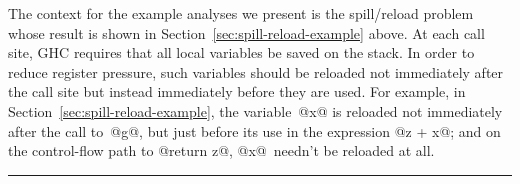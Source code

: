 \documentclass[blockstyle,preprint,nocopyrightspace]{sigplanconf}
\newcommand\secref[1]{Section~\ref{sec:#1}}
\newcommand\seclabel[1]{\label{sec:#1}}
\begin{document}
% 
% 
% 
% 

The context for
the example analyses we present is the spill/reload problem whose
result is shown in \secref{spill-reload-example} above.
At each call site, GHC requires that all local variables be saved on
the stack.
In order to reduce register pressure,
such variables should be reloaded not immediately after the call site
but instead immediately before they are used.
For example, in
\secref{spill-reload-example}, the variable~@x@ is reloaded not
immediately after the call to~@g@, but just before its use in the
expression @z + x@;
and on the control-flow path to @return z@, @x@~needn't be reloaded
at all.


\seclabel{spill-reload-example}

\hrule
\end{document}
